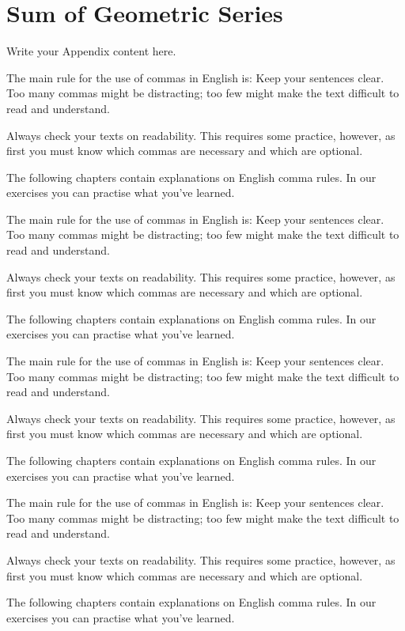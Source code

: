 \chapter{Sum of Geometric Series} 
\label{AppendixA} 


Write your Appendix content here.

The main rule for the use of commas in English is: Keep your sentences clear. Too many commas might be distracting; too few might make the text difficult to read and understand.

Always check your texts on readability. This requires some practice, however, as first you must know which commas are necessary and which are optional.

The following chapters contain explanations on English comma rules. In our exercises you can practise what you've learned.



The main rule for the use of commas in English is: Keep your sentences clear. Too many commas might be distracting; too few might make the text difficult to read and understand.

Always check your texts on readability. This requires some practice, however, as first you must know which commas are necessary and which are optional.

The following chapters contain explanations on English comma rules. In our exercises you can practise what you've learned.



The main rule for the use of commas in English is: Keep your sentences clear. Too many commas might be distracting; too few might make the text difficult to read and understand.

Always check your texts on readability. This requires some practice, however, as first you must know which commas are necessary and which are optional.

The following chapters contain explanations on English comma rules. In our exercises you can practise what you've learned.


The main rule for the use of commas in English is: Keep your sentences clear. Too many commas might be distracting; too few might make the text difficult to read and understand.

Always check your texts on readability. This requires some practice, however, as first you must know which commas are necessary and which are optional.

The following chapters contain explanations on English comma rules. In our exercises you can practise what you've learned.



